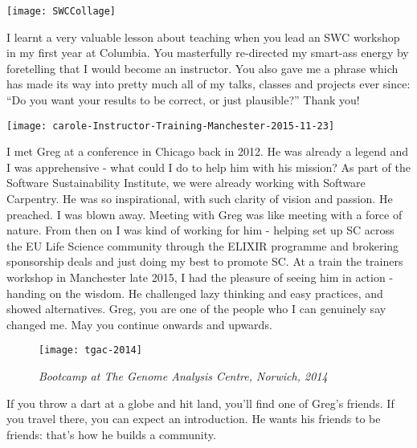 
\newpage
\begin{center}
\texttt{[image: SWCCollage]}
\end{center}

I learnt a very valuable lesson about teaching when you lead an SWC workshop in
my first year at Columbia.  You masterfully re-directed my smart-ass energy by
foretelling that I would become an instructor. You also gave me a phrase which
has made its way into pretty much all of my talks, classes and projects ever
since: ``Do you want your results to be correct, or just plausible?'' Thank
you!


\newpage

\vspace*{\fill}
\texttt{[image: carole-Instructor-Training-Manchester-2015-11-23]}

I met Greg at  a conference in Chicago back in 2012. He was already a legend
and I was apprehensive - what could I do to help him with his mission? As part
of the Software Sustainability Institute, we were already working with Software
Carpentry. He was so inspirational, with such clarity of vision and passion. He
preached. I was blown away.  Meeting with Greg was like meeting with a force of
nature. From then on I was kind of working for him - helping set up SC across
the EU Life Science community through the ELIXIR programme and brokering
sponsorship deals and just doing my best  to promote SC. At a train the
trainers workshop in Manchester late 2015, I had the pleasure of seeing him in
action - handing on the wisdom. He challenged lazy thinking and easy practices,
and showed alternatives. Greg, you are one of the people who I can genuinely
say changed me. May you continue onwards and upwards.

\vspace*{\fill}

\newpage
\vspace*{\fill}

\begin{figure}[h!]
\begin{center}
\texttt{[image: tgac-2014]}
    \caption*{\textit{Bootcamp at The Genome Analysis Centre, Norwich, 2014}}
\end{center}
\end{figure}

If you throw a dart at a globe and hit land, you'll find one of Greg's friends.
If you travel there, you can expect an introduction. He wants his friends to be
friends: that's how he builds a community.

